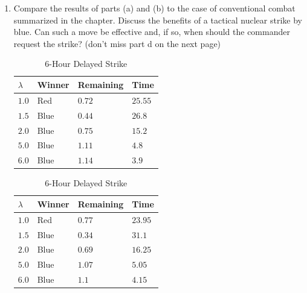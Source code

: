 \documentclass[12pt, oneside]{book}
\newenvironment{solution}{\textit{Solution.}}
\newcommand{\sol}[1]{
    \begin{customframedproof}[linecolor=orangehdx!75,]
        \begin{solution}
        #1
        \end{solution}
    \end{customframedproof}
}
\begin{document}
\begin{enumerate}
\begin{enumerate}
{        }
        \item Compare the results of parts (a) and (b) to the case of conventional combat summarized in the chapter. Discuss the benefits of a tactical nuclear strike by blue. Can such a move be effective and, if so, when should the commander request the strike?
        (don't miss part d on the next page)
\newpage

\begin{table}[t]
    \caption{Chapter 6, Exercise 3 Battle Simulation Results}
    \begin{minipage}{.5\linewidth}
      \caption{Immediate Strike}
      \centering
        \begin{tabular}{llll}
            $\lambda$ & Winner & Remaining & Time \\ \hline
            $1.0$ & Red & $0.72$ & $25.55$ \\
            $1.5$ & Blue & $0.44$ & $26.8$ \\
            $2.0$ & Blue & $0.75$ & $15.2$ \\
            $5.0$ & Blue & $1.11$ & $4.8$ \\
            $6.0$ & Blue & $1.14$ & $3.9$ \\
        \end{tabular}
    \end{minipage}%
    \begin{minipage}{.5\linewidth}
      \centering
        \caption{6-Hour Delayed Strike}
            \begin{tabular}{llll}
            $\lambda$ & Winner & Remaining & Time \\ \hline
            $1.0$ & Red & $0.77$ & $23.95$ \\
            $1.5$ & Blue & $0.34$ & $31.1$ \\
            $2.0$ & Blue & $0.69$ & $16.25$ \\
            $5.0$ & Blue & $1.07$ & $5.05$ \\
            $6.0$ & Blue & $1.1$ & $4.15$ \\
            \end{tabular}
    \end{minipage} 
\end{table}


\end{enumerate}
\end{enumerate}
\end{document}

